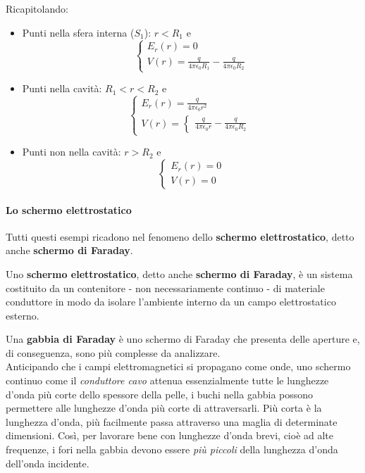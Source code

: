 Ricapitolando:
\begin{itemize}
	\item Punti nella sfera interna ($S_1$): $r<R_1$ e
	\begin{equation*}
		\begin{cases}
			E_{r}(r)=0\\
			V(r)=\frac{q}{4\pi\epsilon_0R_1}-\frac{q}{4\pi\epsilon_0R_2}
		\end{cases}
	\end{equation*}
	\item Punti nella cavità: $R_1<r<R_2$ e
	\begin{equation*}
		\begin{cases}
			E_{r}(r)=\frac{q}{4\pi\epsilon_0 r^2}\\
			V(r)=\begin{cases}
				\frac{q}{4\pi\epsilon_0r}-\frac{q}{4\pi\epsilon_0R_2}
			\end{cases}
		\end{cases}
	\end{equation*}
	\item Punti non nella cavità: $r>R_2$ e
	\begin{equation*}
		\begin{cases}
			E_{r}(r)=0\\
			V(r)=0
		\end{cases}
	\end{equation*}
\end{itemize}

\paragraph{Lo schermo elettrostatico}
Tutti questi esempi ricadono nel fenomeno dello \textbf{schermo elettrostatico}, detto anche \textbf{schermo di Faraday}.
\begin{define}[lol]
	Uno \textbf{schermo elettrostatico}, detto anche \textbf{schermo di Faraday}, è un sistema costituito da un contenitore - non necessariamente continuo - di materiale conduttore in modo da isolare l'ambiente interno da un campo elettrostatico esterno.
\end{define}
\begin{digressionwt}
	Una \textbf{gabbia di Faraday} è uno schermo di Faraday che presenta delle aperture e, di conseguenza, sono più complesse da analizzare.\\
	Anticipando che i campi elettromagnetici si propagano come onde, uno schermo continuo come il \textit{conduttore cavo} attenua essenzialmente tutte le lunghezze d'onda più corte dello spessore della pelle, i buchi nella gabbia possono permettere alle lunghezze d'onda più corte di attraversarli. Più corta è la lunghezza d'onda, più facilmente passa attraverso una maglia di determinate dimensioni. Così, per lavorare bene con lunghezze d'onda brevi, cioè ad alte frequenze, i fori nella gabbia devono essere \textit{più piccoli} della lunghezza d'onda dell'onda incidente.
\end{digressionwt}
